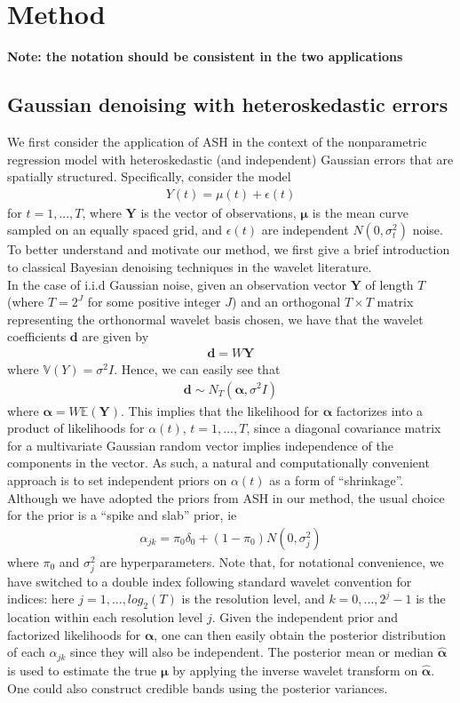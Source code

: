 \documentclass[12pt]{article}
\newcommand{\Ga}{\alpha}
\newcommand{\Gd}{\delta}     \newcommand{\GD}{\Delta}
\newcommand{\Ge}{\epsilon}
\newcommand{\s}{\sigma}
\begin{document}
\section{Method}
\textbf{Note: the notation should be consistent in the two applications}
\subsection{Gaussian denoising with heteroskedastic errors}
We first consider the application of ASH in the context of the nonparametric regression model with heteroskedastic (and independent) Gaussian errors that are spatially structured. Specifically, consider the model
\begin{eqnarray}\label{eq:1d gaussian model}
Y(t)=\mu(t)+\Ge(t)
\end{eqnarray}
for $t=1,...,T$, where $\bm{Y}$ is the vector of observations, $\bm{\mu}$ is the mean curve sampled on an equally spaced grid, and $\Ge(t)$ are independent $N(0,\s_t^2)$ noise. To better understand and motivate our method, we first give a brief introduction to classical Bayesian denoising techniques in the wavelet literature.\bigskip\\
In the case of i.i.d Gaussian noise, given an observation vector $\bm{Y}$ of length $T$ (where $T=2^J$ for some positive integer $J$) and an orthogonal $T\times T$ matrix representing the orthonormal wavelet basis chosen, we have that the wavelet coefficients $\bm{d}$ are given by
\begin{eqnarray}
\bm{d}=W\bm{Y}
\end{eqnarray}
where $\mathbb{V}(Y)=\s^2I$. Hence, we can easily see that
\begin{eqnarray}\label{eq:waveletcoef}
\bm{d}\sim N_T(\bm{\Ga},\s^2I)
\end{eqnarray}
where $\bm{\Ga}=W\mathbb{E}(\bm{Y})$. This implies that the likelihood for $\bm{\Ga}$ factorizes into a product of likelihoods for $\Ga(t)$, $t=1,...,T$, since a diagonal covariance matrix for a multivariate Gaussian random vector implies independence of the components in the vector. As such, a natural and computationally convenient approach is to set independent priors on $\Ga(t)$ as a form of ``shrinkage''. Although we have adopted the priors from ASH in our method, the usual choice for the prior is a ``spike and slab'' prior, ie
\begin{eqnarray}
\Ga_{jk}=\pi_0\Gd_0+(1-\pi_0)N(0,\s_j^2)
\end{eqnarray}
where $\pi_0$ and $\s_j^2$ are hyperparameters. Note that, for notational convenience, we have switched to a double index following standard wavelet convention for indices: here $j=1,...,log_2(T)$ is the resolution level, and $k=0,...,2^j-1$ is the location within each resolution level $j$. Given the independent prior and factorized likelihoods for $\bm{\Ga}$, one can then easily obtain the posterior distribution of each $\Ga_{jk}$ since they will also be independent. The posterior mean or median $\hat{\bm{\Ga}}$ is used to estimate the true $\bm{\mu}$ by applying the inverse wavelet transform on $\hat{\bm{\Ga}}$. One could also construct credible bands using the posterior variances.\bigskip\\
\end{document}
